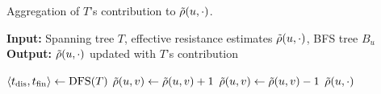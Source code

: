 \begin{algorithm}[t]
\footnotesize
{}
\caption{\footnotesize Aggregation of $T$'s contribution to $\tilde{\rho}(u, \cdot)$.}
\label{algo:ust-aggregation}
\textbf{Input:} Spanning tree $T$, effective resistance estimates $\tilde{\rho}(u, \cdot)$, BFS tree $B_u$\\
\textbf{Output:} $\tilde{\rho}(u, \cdot)$ updated with $T$'s contribution
\begin{algorithmic}[1]
\State$\left<\tdis, \tfin\right>\gets\text{DFS}(T)$\label{line:ust-agg:dfs}
\label{line:ust-agg:ab-in-t}
\label{line:ust-agg:v-below-ab}
\State$\tilde{\rho}(u, v) \gets \tilde{\rho}(u, v) + 1$\label{line:ust-agg:add-1}
\EndIf
{}\label{line:ust-agg:ba-in-t}
\label{line:ust-agg:v-below-ba}
\State$\tilde{\rho}(u, v) \gets \tilde{\rho}(u, v) - 1$\label{line:ust-agg:sub-1}
\EndIf
\EndIf
\EndFor
\EndFor
\State\Return$\tilde{\rho}(u, \cdot)$
\EndFunction
\end{algorithmic}
\end{algorithm}
